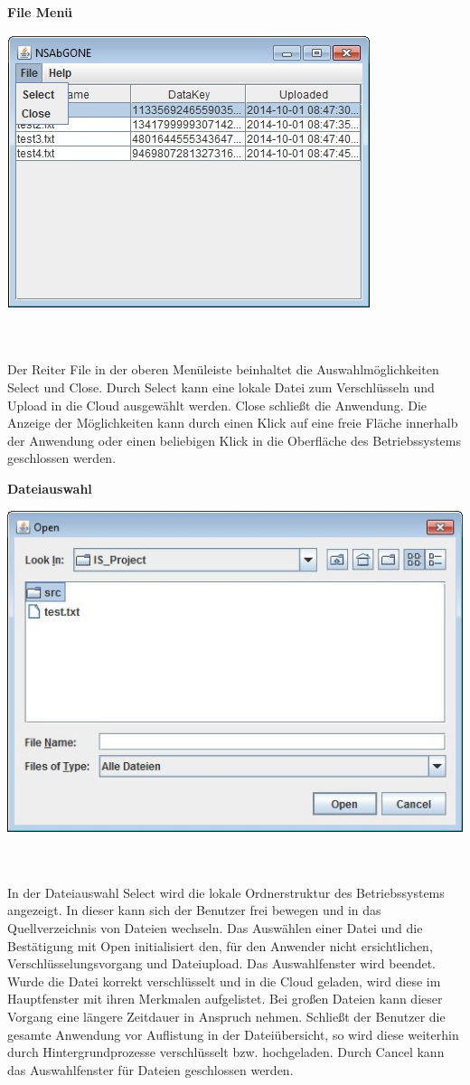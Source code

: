 \documentclass[12pt,a4paper,bibliography=totocnumbered,listof=totocnumbered]{scrartcl}
\begin{document}
\textbf{File Menü}
\vspace{1em}
$\;$\\
\begin{minipage}{\linewidth}
	\centering
	\includegraphics[width=0.4\linewidth]{File.jpg}
	\label{File}
\end{minipage}
\\\\Der Reiter File in der oberen Menüleiste beinhaltet die Auswahlmöglichkeiten Select und Close. Durch Select kann eine lokale Datei zum Verschlüsseln und Upload in die Cloud ausgewählt werden. Close schließt die Anwendung. Die Anzeige der Möglichkeiten kann durch einen Klick auf eine freie Fläche innerhalb der Anwendung oder einen beliebigen Klick in die Oberfläche des Betriebssystems geschlossen werden.

\textbf{Dateiauswahl}
\vspace{1em}
$\;$\\
\begin{minipage}{\linewidth}
	\centering
	\includegraphics[width=0.4\linewidth]{Select.jpg}
	\label{Select}
\end{minipage}
\\\\In der Dateiauswahl Select wird die lokale Ordnerstruktur des Betriebssystems angezeigt. In dieser kann sich der Benutzer frei bewegen und in das Quellverzeichnis von Dateien wechseln. Das Auswählen einer Datei und die Bestätigung mit Open initialisiert den, für den Anwender nicht ersichtlichen, Verschlüsselungsvorgang und Dateiupload. Das Auswahlfenster wird beendet. Wurde die Datei korrekt verschlüsselt und in die Cloud geladen, wird diese im Hauptfenster mit ihren Merkmalen aufgelistet. Bei großen Dateien kann dieser Vorgang eine längere Zeitdauer in Anspruch nehmen. Schließt der Benutzer die gesamte Anwendung vor Auflistung in der Dateiübersicht, so wird diese weiterhin durch Hintergrundprozesse verschlüsselt bzw. hochgeladen. Durch Cancel kann das Auswahlfenster für Dateien geschlossen werden.
\end{document}
